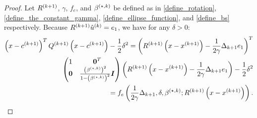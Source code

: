 \begin{proof}
Let ${R^{(k+1)}}$, $\gamma$, $f_e$, and ${\beta^{(\star, k)}}$ be defined as in \cref{define_rotation}, \cref{define_the_constant_gamma}, \cref{define_ellipse_function}, and \cref{define_bs} respectively.
Because ${R^{(k+1)}}{{\hat u}^{(k)}} = e_1$, we have for any $\delta > 0$:
\begin{align*}
\left(x - {c^{(k+1)}}\right)^T{Q^{(k+1)}}\left(x - {c^{(k+1)}}\right) - \frac 1 2 \delta^2 
= \left({R^{(k+1)}}\left(x-{{x}^{(k+1)}}\right) - \frac 1 {2\gamma} \Delta_{k+1} e_1\right)^T \\ \begin{pmatrix}
1 & \boldsymbol0^T \\
\boldsymbol 0 & \frac{\left({\beta^{(\star, k)}}\right)^2}{1 - \left({\beta^{(\star, k)}}\right)^2} \boldsymbol I \\
\end{pmatrix} \left({R^{(k+1)}}\left(x-{{x}^{(k+1)}}\right) - \frac 1 {2\gamma} \Delta_{k+1} e_1\right) - \frac 1 2 \delta^2 \\
= f_e\left(\frac 1 {2\gamma} \Delta_{k+1}, \delta, {\beta^{(\star, k)}}; {R^{(k+1)}}\left(x - {{x}^{(k+1)}}\right)\right).
\end{align*}




\end{proof}
